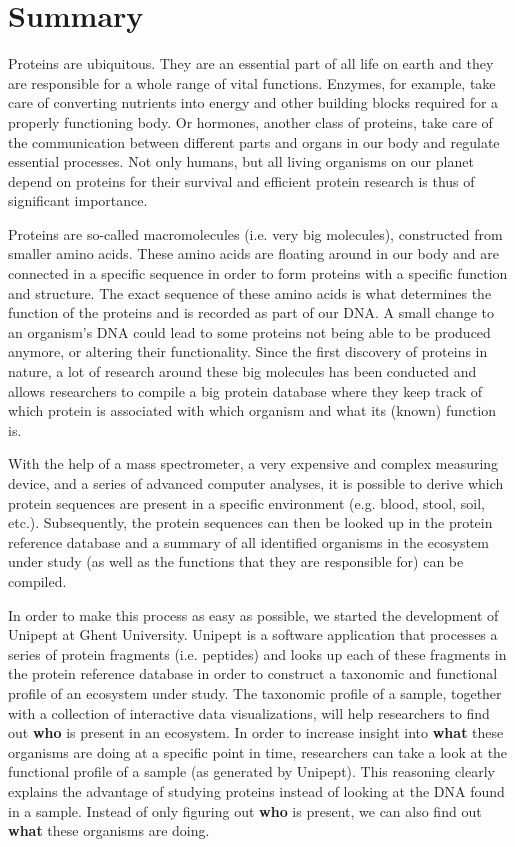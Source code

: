 \chapter*{Summary}

Proteins are ubiquitous.
They are an essential part of all life on earth and they are responsible for a whole range of vital functions.
Enzymes, for example, take care of converting nutrients into energy and other building blocks required for a properly functioning body.
Or hormones, another class of proteins, take care of the communication between different parts and organs in our body and regulate essential processes.
Not only humans, but all living organisms on our planet depend on proteins for their survival and efficient protein research is thus of significant importance.

Proteins are so-called macromolecules (i.e. very big molecules), constructed from smaller amino acids.
These amino acids are floating around in our body and are connected in a specific sequence in order to form proteins with a specific function and structure.
The exact sequence of these amino acids is what determines the function of the proteins and is recorded as part of our DNA.
A small change to an organism's DNA could lead to some proteins not being able to be produced anymore, or altering their functionality.
Since the first discovery of proteins in nature, a lot of research around these big molecules has been conducted and allows researchers to compile a big protein database where they keep track of which protein is associated with which organism and what its (known) function is.

With the help of a mass spectrometer, a very expensive and complex measuring device, and a series of advanced computer analyses, it is possible to derive which protein sequences are present in a specific environment (e.g. blood, stool, soil, etc.).
Subsequently, the protein sequences can then be looked up in the protein reference database and a summary of all identified organisms in the ecosystem under study (as well as the functions that they are responsible for) can be compiled.

In order to make this process as easy as possible, we started the development of Unipept at Ghent University.
Unipept is a software application that processes a series of protein fragments (i.e. peptides) and looks up each of these fragments in the protein reference database in order to construct a taxonomic and functional profile of an ecosystem under study.
The taxonomic profile of a sample, together with a collection of interactive data visualizations, will help researchers to find out \textbf{who} is present in an ecosystem.
In order to increase insight into \textbf{what} these organisms are doing at a specific point in time, researchers can take a look at the functional profile of a sample (as generated by Unipept).
This reasoning clearly explains the advantage of studying proteins instead of looking at the DNA found in a sample.
Instead of only figuring out \textbf{who} is present, we can also find out \textbf{what} these organisms are doing.

